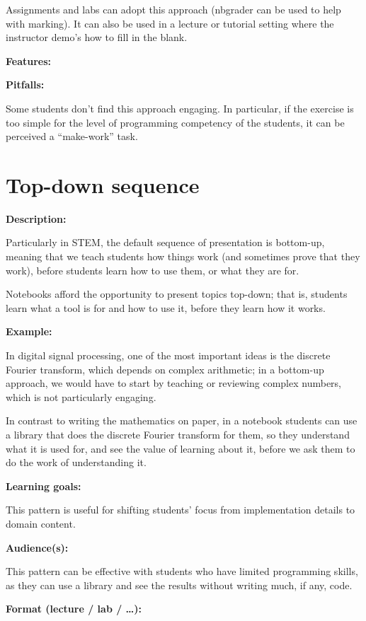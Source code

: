 \documentclass[]{book}
\begin{document}
Assignments and labs can adopt this approach (nbgrader can be used to
help with marking). It can also be used in a lecture or tutorial setting
where the instructor demo's how to fill in the blank.

\textbf{Features:}

\textbf{Pitfalls:}

Some students don't find this approach engaging. In particular, if the
exercise is too simple for the level of programming competency of the
students, it can be perceived a ``make-work'' task.

\section{Top-down sequence}\label{top-down-sequence}

\textbf{Description:}

Particularly in STEM, the default sequence of presentation is bottom-up,
meaning that we teach students how things work (and sometimes prove that
they work), before students learn how to use them, or what they are for.

Notebooks afford the opportunity to present topics top-down; that is,
students learn what a tool is for and how to use it, before they learn
how it works.

\textbf{Example:}

In digital signal processing, one of the most important ideas is the
discrete Fourier transform, which depends on complex arithmetic; in a
bottom-up approach, we would have to start by teaching or reviewing
complex numbers, which is not particularly engaging.

In contrast to writing the mathematics on paper, in a notebook students
can use a library that does the discrete Fourier transform for them, so
they understand what it is used for, and see the value of learning about
it, before we ask them to do the work of understanding it.

\textbf{Learning goals:}

This pattern is useful for shifting students' focus from implementation
details to domain content.

\textbf{Audience(s):}

This pattern can be effective with students who have limited programming
skills, as they can use a library and see the results without writing
much, if any, code.

\textbf{Format (lecture / lab / \ldots{}):}
\end{document}
